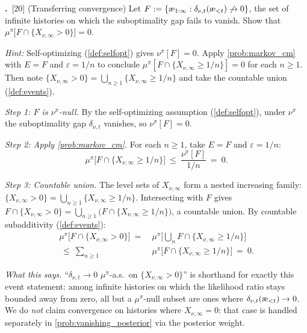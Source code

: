 \documentclass[fontsize=11pt, parskip=half]{scrartcl}
\theoremstyle{definition}
\newenvironment{solution}{%
    \begin{tcolorbox}[colback=black!5!white, colframe=black!50!white,
      title={\textbf{Solution}}, fonttitle=\normalfont, breakable]
  }{\end{tcolorbox}}
\newenvironment{solution}{\expandafter\comment}{\expandafter\endcomment}
\newcommand{\mysubsection}[2]{\par\medskip\noindent\refstepcounter{subsection}\textbf{\thesubsection.}~#2\par\smallskip}
\newcommand{\aes}{\textnormal{\ae}}
\begin{document}
\mysubsection{3}{[20] (Transferring convergence) Let $F := \{\aes_{1:\infty} : \delta_{\nu,t}(\aes_{<t}) \not\to 0\}$, the set of infinite histories on which the suboptimality gap fails to vanish. Show that $\mu^\pi\big[F \cap \{X_{\nu,\infty} > 0\}\big] = 0$. \label{prob:delta_transfer}}

\textit{Hint:} Self-optimizing (\cref{def:selfopt}) gives $\nu^\pi[F] = 0$. Apply \cref{prob:markov_cm} with $E = F$ and $\varepsilon = 1/n$ to conclude $\mu^\pi[F \cap \{X_{\nu,\infty} \geq 1/n\}] = 0$ for each $n \geq 1$. Then note $\{X_{\nu,\infty} > 0\} = \bigcup_{n \geq 1} \{X_{\nu,\infty} \geq 1/n\}$ and take the countable union (\cref{def:events}).

\begin{solution}
\emph{Step 1: $F$ is $\nu^\pi$-null.} By the self-optimizing assumption (\cref{def:selfopt}), under $\nu^\pi$ the suboptimality gap $\delta_{\nu,t}$ vanishes, so $\nu^\pi[F] = 0$.

\emph{Step 2: Apply \cref{prob:markov_cm}.} For each $n \geq 1$, take $E = F$ and $\varepsilon = 1/n$:
\[
    \mu^\pi\!\big[F \cap \{X_{\nu,\infty} \geq 1/n\}\big]
    ~\leq~ \frac{\nu^\pi[F]}{1/n}
    ~=~ 0.
\]

\emph{Step 3: Countable union.} The level sets of $X_{\nu,\infty}$ form a nested increasing family: $\{X_{\nu,\infty} > 0\} = \bigcup_{n \geq 1} \{X_{\nu,\infty} \geq 1/n\}$. Intersecting with $F$ gives $F \cap \{X_{\nu,\infty} > 0\} = \bigcup_{n \geq 1} \big(F \cap \{X_{\nu,\infty} \geq 1/n\}\big)$, a countable union. By countable subadditivity (\cref{def:events}):
\begin{align*}
    \mu^\pi\!\big[F \cap \{X_{\nu,\infty} > 0\}\big]
    ~=~ &\mu^\pi\!\Big[\textstyle\bigcup_{n} F \cap \{X_{\nu,\infty} \geq 1/n\}\Big] \\
    ~\leq~ \sum_{n \geq 1} \, &\mu^\pi\!\big[F \cap \{X_{\nu,\infty} \geq 1/n\}\big]
    ~=~ 0.
\end{align*}

\emph{What this says.} ``$\delta_{\nu,t} \to 0$ $\mu^\pi$-a.s.\ on $\{X_{\nu,\infty} > 0\}$'' is shorthand for exactly this event statement: among infinite histories on which the likelihood ratio stays bounded away from zero, all but a $\mu^\pi$-null subset are ones where $\delta_{\nu,t}(\aes_{<t}) \to 0$. We do \emph{not} claim convergence on histories where $X_{\nu,\infty} = 0$: that case is handled separately in \cref{prob:vanishing_posterior} via the posterior weight.
\end{solution}
\end{document}
